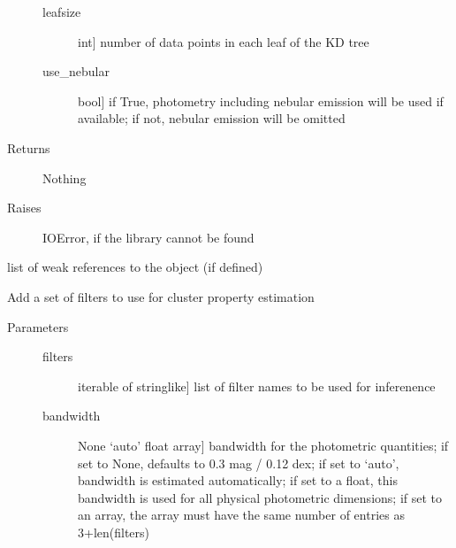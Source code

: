 \documentclass[letterpaper,10pt,english]{sphinxmanual}
\begin{document}
\begin{fulllineitems}
\begin{fulllineitems}
\begin{description}
\begin{description}
\item[{leafsize}] \leavevmode{[}int{]}
number of data points in each leaf of the KD tree

\item[{use\_nebular}] \leavevmode{[}bool{]}
if True, photometry including nebular emission will be
used if available; if not, nebular emission will be
omitted

\end{description}

\item[{Returns}] \leavevmode
Nothing

\item[{Raises}] \leavevmode
IOError, if the library cannot be found

\end{description}

\end{fulllineitems}


\begin{fulllineitems}
\label{cluster_slug:slugpy.cluster_slug.cluster_slug.__weakref__}
list of weak references to the object (if defined)

\end{fulllineitems}


\begin{fulllineitems}
\label{cluster_slug:slugpy.cluster_slug.cluster_slug.add_filters}
Add a set of filters to use for cluster property estimation
\begin{description}
\item[{Parameters}] \leavevmode\begin{description}
\item[{filters}] \leavevmode{[}iterable of stringlike{]}
list of filter names to be used for inferenence

\item[{bandwidth}] \leavevmode{[}None \textbar{} `auto' \textbar{} float \textbar{} array{]}
bandwidth for the photometric quantities; if set to
None, defaults to 0.3 mag / 0.12 dex; if set to `auto',
bandwidth is estimated automatically; if set to a float,
this bandwidth is used for all physical photometric
dimensions; if set to an array, the array must have the
same number of entries as 3+len(filters)


\end{description}
\end{description}
\end{fulllineitems}
\end{fulllineitems}
\end{document}
